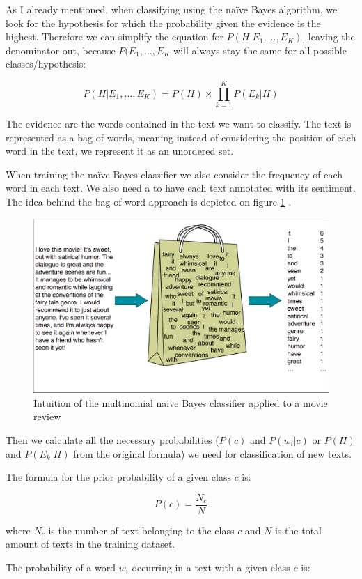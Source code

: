 As I already mentioned, when classifying using the na\"ive Bayes algorithm, we look for the hypothesis for which the probability given the evidence is the highest. Therefore we can simplify the equation for $P\left(H|E_{1},\ldots,E_{K}\right)$, leaving the denominator out, because $P(E_{1},\ldots,E_{K}$ will always stay the same for all possible classes/hypothesis:

$$P\left(H|E_{1},\ldots,E_{K}\right)=P(H)\times\prod_{k=1}^{K}P\left(E_{k}|H\right)$$


The evidence are the words contained in the text we want to classify. The text is represented as a bag-of-words, meaning instead of considering the position of each word in the text, we represent it as an unordered set.

When training the na\"ive Bayes classifier we also consider the frequency of each word in each text. We also need a to have each text annotated with its sentiment. The idea behind the bag-of-word approach is depicted on figure \ref{img02:bof}
.
   \begin{figure}[htbp!]\centering
\includegraphics[width=.66\textwidth]{img/bagofwords}
      \caption[Intuition of the multinomial naive Bayes classifier applied to a movie review]{Intuition of the multinomial naive Bayes classifier applied to a movie review \cite{bagofwords}}\label{img02:bof}
    \end{figure}


Then we calculate all the necessary probabilities ($P(c)$ and $P(w_{i}|c)$ or $P(H)$ and $P(E_{k}|H)$ from the original formula) we need for classification of new texts.

The formula for the prior probability of a given class $c$ is:

$$P(c) = \frac{N_{c}}{N}$$

where $N_{c}$ is the number of text belonging to the class $c$ and $N$ is the total amount of texts in the training dataset.

The probability of a word $w_{i}$ occurring in a text with a given class $c$ is:

